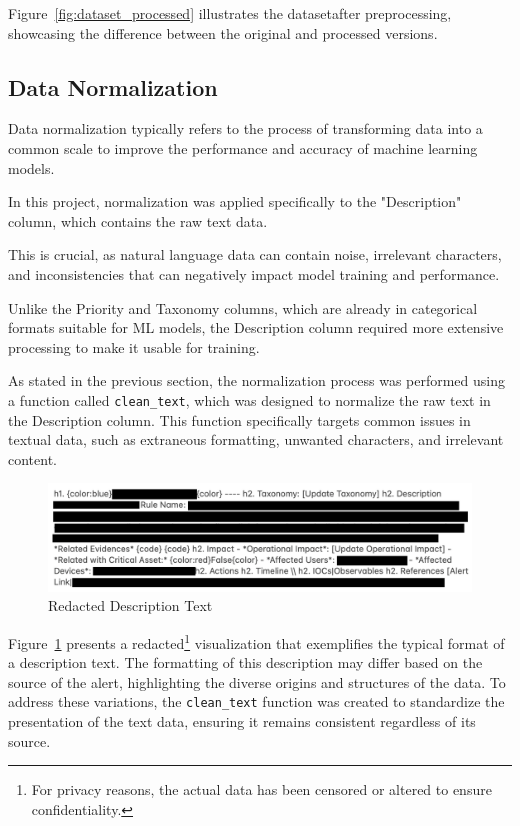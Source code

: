 Figure~\ref{fig:dataset_processed} illustrates the dataset\footnotemark[\value{footnote}] after preprocessing, showcasing the difference between the original and processed versions.

\subsection{Data Normalization}
Data normalization typically refers to the process of transforming data into a common scale to improve the performance and accuracy of machine learning models. 

In this project, normalization was applied specifically to the "Description" column, which contains the raw text data. 

This is crucial, as natural language data can contain noise, irrelevant characters, and inconsistencies that can negatively impact model training and performance. 

Unlike the Priority and Taxonomy columns, which are already in categorical formats suitable for ML models, the Description column required more extensive processing to make it usable for training.

As stated in the previous section, the normalization process was performed using a function called \texttt{clean\_text}, which was designed to normalize the raw text in the Description column. 
This function specifically targets common issues in textual data, such as extraneous formatting, unwanted characters, and irrelevant content.

\begin{figure}[h!]
    \centering
    \includegraphics[width=\textwidth]{ch3/assets/redacted_description_text.png}
    \caption{Redacted Description Text}
    \label{fig:redacted_description_text}
\end{figure}

Figure~\ref{fig:redacted_description_text} presents a redacted\footnote{For privacy reasons, the actual data has been censored or altered to ensure confidentiality.} visualization that exemplifies the typical format of a description text.
The formatting of this description may differ based on the source of the alert, highlighting the diverse origins and structures of the data. 
To address these variations, the \texttt{clean\_text} function was created to standardize the presentation of the text data, ensuring it remains consistent regardless of its source.


